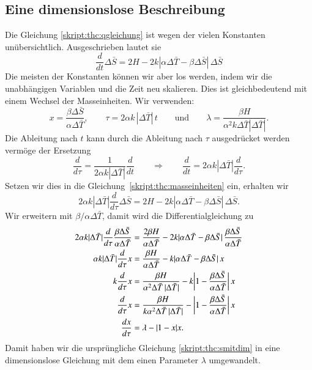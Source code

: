 \subsection{Eine dimensionslose Beschreibung}
Die Gleichung \eqref{skript:thc:qgleichung} ist wegen der vielen
Konstanten unübersichtlich.
Ausgeschrieben lautet sie
\begin{equation}
\frac{d}{dt}\Delta\bar S
=
2H
-2k|\alpha\Delta\bar T- \beta \Delta\bar S|\,\Delta\bar S
\label{skript:thc:smitdim}
\end{equation}
Die meisten der Konstanten können wir aber los werden, indem wir 
die unabhängigen Variablen und die Zeit neu skalieren.
Dies ist gleichbedeutend mit einem Wechsel der Masseinheiten.
Wir verwenden:
\begin{equation}
x=\frac{\beta\Delta\bar S}{\alpha\Delta\bar T},
\qquad
\tau = 2\alpha k\,|\Delta\bar T|\, t
\qquad\text{und}\qquad
\lambda = \frac{\beta H}{\alpha^2 k\Delta\bar T|\Delta\bar T|}.
\label{skript:thc:masseinheiten}
\end{equation}
Die Ableitung nach $t$ kann durch die Ableitung nach $\tau$ ausgedrücket
werden vermöge der Ersetzung
\[
\frac{d}{d\tau}
=
\frac{1}{2\alpha k|\Delta\bar T|}
\frac{d}{dt}
\qquad\Rightarrow\qquad
\frac{d}{dt}
=
2\alpha k|\Delta\bar T|\frac{d}{d\tau}.
\]
Setzen wir dies in die Gleichung~\eqref{skript:thc:masseinheiten}
ein, erhalten wir
\begin{equation}
2\alpha k|\Delta\bar T|
\frac{d}{d\tau} \Delta\bar S
=
2H-2k|\alpha\Delta\bar T-\beta\Delta\bar S|\,\Delta\bar S.
\end{equation}
Wir erweitern mit $\beta/\alpha\Delta\bar T$, damit wird die
Differentialgleichung zu
\begin{align}
2\alpha k|\Delta\bar T|
\frac{d}{d\tau}\frac{\beta\Delta\bar S}{\alpha\Delta\bar T}
&=
\frac{2\beta H}{\alpha\Delta\bar T} - 2k|\alpha\Delta\bar T-\beta\Delta\bar S|\,
\frac{\beta\Delta\bar S}{\alpha\Delta\bar T}
\notag
\\
\alpha k|\Delta\bar T|
\frac{d}{d\tau}x
&=
\frac{\beta H}{\alpha\Delta\bar T}
-k|\alpha\Delta\bar T-\beta\Delta\bar S|\, x
\notag
\\
k
\frac{d}{d\tau}x
&=
\frac{\beta H}{\alpha^2\Delta\bar T\,|\Delta\bar T|}
-k\biggl|1-\frac{\beta\Delta\bar S}{\alpha\Delta\bar T}\biggr|\,x
\notag
\\
\frac{d}{d\tau}x
&=
\frac{\beta H}{k\alpha^2\Delta\bar T\,|\Delta\bar T|}
-\biggl|1-\frac{\beta\Delta\bar S}{\alpha\Delta\bar T}\biggr|\,x
\notag
\\
\frac{dx}{d\tau}
&=
\lambda - |1-x|x.
\label{skript:thc:dimensionslos}
\end{align}
Damit haben wir die ursprüngliche Gleichung
\eqref{skript:thc:smitdim}
in eine dimensionslose Gleichung mit dem einen Parameter $\lambda$
umgewandelt.

